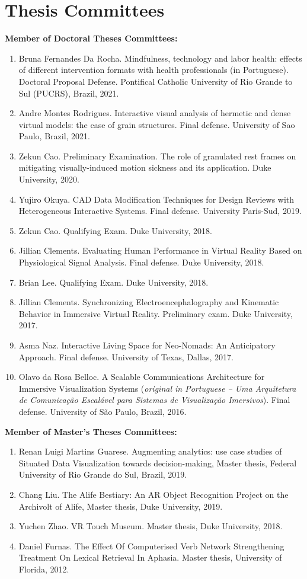 \documentclass[wideaddress]{vitae}
\newcommand{\resitem}[1]{
	\item \begin{flushleft} #1 \end{flushleft}
}
\newenvironment{resnumberedlist}[1]{
	\resitem{\textbf{#1}}
	\begin{enumerate}
}{
	\end{enumerate}
}
\begin{document}
\section{Thesis Committees}
\begin{description}
	\begin{resnumberedlist}{Member of Doctoral Theses Committees:}
	\resitem{Bruna Fernandes Da Rocha. Mindfulness, technology and labor health: effects of different intervention formats with health professionals (in Portuguese). Doctoral Proposal Defense. Pontifical Catholic University of Rio Grande to Sul (PUCRS), Brazil, 2021.}
	\resitem{Andre Montes Rodrigues. Interactive visual analysis of hermetic and dense virtual models: the case of grain structures. Final defense. University of Sao Paulo, Brazil, 2021.}
	\resitem{Zekun Cao. Preliminary Examination. The role of granulated rest frames on mitigating visually-induced motion sickness and its application. Duke University, 2020.}
\resitem{Yujiro Okuya. CAD Data Modification Techniques for Design Reviews with Heterogeneous Interactive Systems. Final defense. University Paris-Sud, 2019.}
	\resitem{Zekun Cao. Qualifying Exam. Duke University, 2018.}
	\resitem{Jillian Clements. Evaluating Human Performance in Virtual Reality Based on Physiological Signal Analysis. Final defense. Duke University, 2018.}
	\resitem{Brian Lee. Qualifying Exam. Duke University, 2018.}
	\resitem{Jillian Clements. Synchronizing Electroencephalography and Kinematic Behavior in Immersive Virtual Reality. Preliminary exam. Duke University, 2017.}
	\resitem{Asma Naz. Interactive Living Space for Neo-Nomads: An Anticipatory Approach. Final defense. University of Texas, Dallas, 2017.}
	\resitem{Olavo da Rosa Belloc. A Scalable Communications Architecture for Immersive Visualization Systems (\textit{original in Portuguese -- Uma Arquitetura de Comunica\c{c}\~ao Escal\'avel para Sistemas de Visualiza\c{c}\~ao Imersivos}). Final defense. University of S\~ao Paulo, Brazil, 2016.}
	\end{resnumberedlist}

	\begin{resnumberedlist}{Member of Master's Theses Committees:}
	\resitem{Renan Luigi Martins Guarese. Augmenting analytics: use case studies of Situated Data Visualization towards decision-making, Master thesis, Federal University of Rio Grande do Sul, Brazil, 2019.}
	\resitem{Chang Liu. The Alife Bestiary: An AR Object Recognition Project on the Archivolt of Alife, Master thesis, Duke University, 2019.}
	\resitem{Yuchen Zhao. VR Touch Museum. Master thesis, Duke University, 2018.}
	\resitem{Daniel Furnas. The Effect Of Computerised Verb Network Strengthening Treatment On Lexical Retrieval In Aphasia. Master thesis, University of Florida, 2012.}
	\end{resnumberedlist}
	

\end{description}
\end{document}
